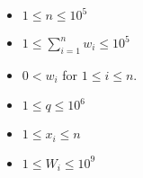 \begin{itemize}
\tightlist
\item $1 \leq n \leq 10^5$
\item $1 \le \sum_{i=1}^{n} w_i \leq 10^5$
\item $0 < w_i$ for $1 \leq i \leq n$.
\item $1 \leq q \leq 10^6$
\item $1 \leq x_i \leq n$
\item $1 \leq W_i \leq 10^9$
\end{itemize}
\newpage
